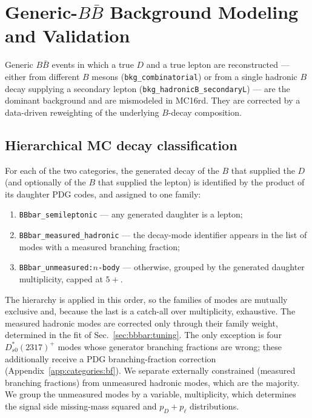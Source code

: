 \section{Generic-$B\bar{B}$ Background Modeling and Validation}
\label{sec:bbbar}

Generic $B\bar{B}$ events in which a true $D$ and a true lepton are
reconstructed --- either from different $B$ mesons
(\texttt{bkg\_combinatorial}) or from a single hadronic $B$ decay supplying a
secondary lepton (\texttt{bkg\_hadronicB\_secondaryL}) --- are the dominant
background and are mismodeled in MC16rd.
They are corrected by a data-driven reweighting of the underlying $B$-decay
composition.

\subsection{Hierarchical MC decay classification}
\label{sec:bbbar:hierarchy}
For each of the two categories, the generated decay of the $B$ that supplied
the $D$ (and optionally of the $B$ that supplied the lepton) is identified by
the product of its daughter PDG codes, and assigned to one family:
\begin{enumerate}
  \item \texttt{BBbar\_semileptonic} --- any generated daughter is a lepton;
  \item \texttt{BBbar\_measured\_hadronic} --- the decay-mode identifier
        appears in the list of modes with a measured branching fraction;
  \item \texttt{BBbar\_unmeasured:$n$-body} --- otherwise, grouped by the
        generated daughter multiplicity, capped at $5+$.
\end{enumerate}
The hierarchy is applied in this order, so the families of modes are mutually
exclusive and, because the last is a catch-all over multiplicity, exhaustive.
The measured hadronic modes are corrected only through their family weight,
determined in the fit of Sec.~\ref{sec:bbbar:tuning}.
The only exception is four $D_{s0}^{*}(2317)^{+}$ modes whose generator
branching fractions are wrong; these additionally receive a PDG
branching-fraction correction (Appendix~\ref{app:categories:bf}).
We separate externally constrained (measured branching
fractions) from unmeasured hadronic modes, which are the majority.
We group the unmeasured modes by a
variable, multiplicity, which determines the signal side missing-mass squared and 
$p_D + p_\ell$ distributions.

